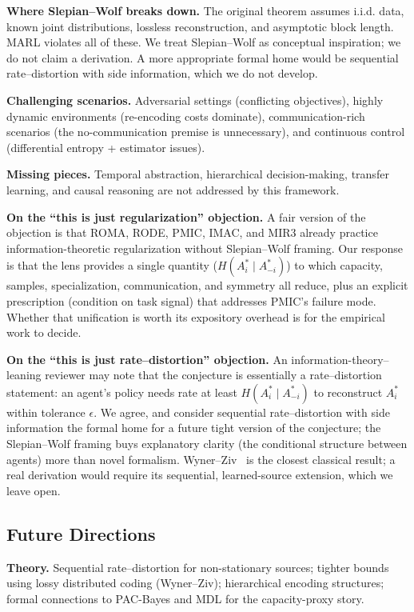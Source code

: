 \documentclass[10pt, letterpaper]{article}
\begin{document}
\textbf{Where Slepian--Wolf breaks down.} The original theorem assumes i.i.d. data, known joint distributions, lossless reconstruction, and asymptotic block length. MARL violates all of these. We treat Slepian--Wolf as conceptual inspiration; we do not claim a derivation. A more appropriate formal home would be sequential rate--distortion with side information, which we do not develop.

\textbf{Challenging scenarios.} Adversarial settings (conflicting objectives), highly dynamic environments (re-encoding costs dominate), communication-rich scenarios (the no-communication premise is unnecessary), and continuous control (differential entropy + estimator issues).

\textbf{Missing pieces.} Temporal abstraction, hierarchical decision-making, transfer learning, and causal reasoning are not addressed by this framework.

\textbf{On the ``this is just regularization'' objection.} A fair version of the objection is that ROMA, RODE, PMIC, IMAC, and MIR3 already practice information-theoretic regularization without Slepian--Wolf framing. Our response is that the lens provides a single quantity ($H(A_i^*\mid A_{-i}^*)$) to which capacity, samples, specialization, communication, and symmetry all reduce, plus an explicit prescription (condition on task signal) that addresses PMIC's failure mode. Whether that unification is worth its expository overhead is for the empirical work to decide.

\textbf{On the ``this is just rate--distortion'' objection.} An information-theory--leaning reviewer may note that the conjecture is essentially a rate--distortion statement: an agent's policy needs rate at least $H(A_i^*\mid A_{-i}^*)$ to reconstruct $A_i^*$ within tolerance $\epsilon$. We agree, and consider sequential rate--distortion with side information the formal home for a future tight version of the conjecture; the Slepian--Wolf framing buys explanatory clarity (the conditional structure between agents) more than novel formalism. Wyner--Ziv~\cite{wyner1976} is the closest classical result; a real derivation would require its sequential, learned-source extension, which we leave open.

\subsection{Future Directions}

\textbf{Theory.} Sequential rate--distortion for non-stationary sources; tighter bounds using lossy distributed coding (Wyner--Ziv); hierarchical encoding structures; formal connections to PAC-Bayes and MDL for the capacity-proxy story.
\end{document}

